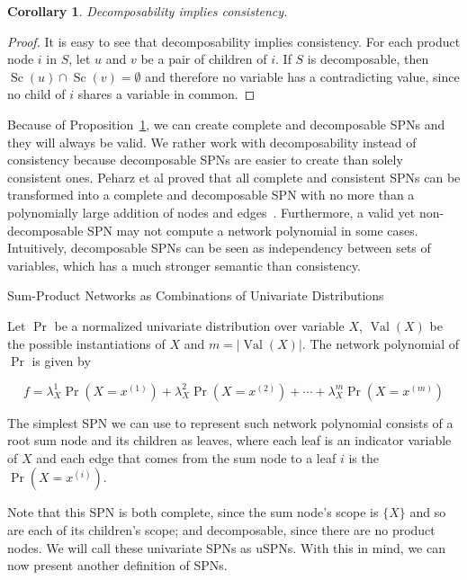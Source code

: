 \documentclass{amsart}
\makeatletter
\def\subsection{\@startsection{subsection}{3}%
  \z@{.5\linespacing\@plus.7\linespacing}{.1\linespacing}%
  {\normalfont\itshape}}
\DeclareMathOperator*{\Val}{\text{Val}}
\DeclareMathOperator*{\Sc}{\text{Sc}}
\theoremstyle{plain}
\newcounter{dummy-def}\numberwithin{dummy-def}{section}
\newcounter{dummy-thm}\numberwithin{dummy-thm}{section}
\newcounter{dummy-prop}\numberwithin{dummy-prop}{section}
\newcounter{dummy-corollary}\numberwithin{dummy-corollary}{section}
\newtheorem{corollary}[dummy-corollary]{Corollary}
\newcounter{dummy-ex}\numberwithin{dummy-ex}{section}
\newcounter{dummy-eg}\numberwithin{dummy-eg}{section}
\numberwithin{equation}{section}
\makeatother
\begin{document}
\begin{corollary}\label{decimpliescons}
  Decomposability implies consistency.
\end{corollary}
\begin{proof}
  It is easy to see that decomposability implies consistency. For each product node $i$ in $S$,
  let $u$ and $v$ be a pair of children of $i$. If $S$ is decomposable, then $\Sc(u)\cap\Sc(v)=
  \emptyset$ and therefore no variable has a contradicting value, since no child of $i$ shares a
  variable in common.
\end{proof}

Because of Proposition~\ref{decimpliescons}, we can create complete and decomposable SPNs and they
will always be valid. We rather work with decomposability instead of consistency because
decomposable SPNs are easier to create than solely consistent ones. Peharz et al proved that
all complete and consistent SPNs can be transformed into a complete and decomposable SPN with no
more than a polynomially large addition of nodes and edges~\cite{theoretical-spn}. Furthermore, a
valid yet non-decomposable SPN may not compute a network polynomial in some cases. Intuitively,
decomposable SPNs can be seen as independency between sets of variables, which has a much stronger
semantic than consistency.

\subsection{Sum-Product Networks as Combinations of Univariate Distributions}

Let $\Pr$ be a normalized univariate distribution over variable $X$, $\Val(X)$ be the possible
instantiations of $X$ and $m=|\Val(X)|$. The network polynomial of $\Pr$ is given by

\begin{equation*}
  f=\lambda_X^1\Pr(X=x^{(1)})+\lambda_X^2\Pr(X=x^{(2)})+\cdots+\lambda_X^m\Pr(X=x^{(m)})
\end{equation*}

The simplest SPN we can use to represent such network polynomial consists of a root sum node and
its children as leaves, where each leaf is an indicator variable of $X$ and each edge that comes
from the sum node to a leaf $i$ is the $\Pr(X=x^{(i)})$.

\begin{center}
  
\end{center}

Note that this SPN is both complete, since the sum node's scope is $\{X\}$ and so are each of its
children's scope; and decomposable, since there are no product nodes. We will call these univariate
SPNs as uSPNs. With this in mind, we can now present another definition of SPNs.
\end{document}
